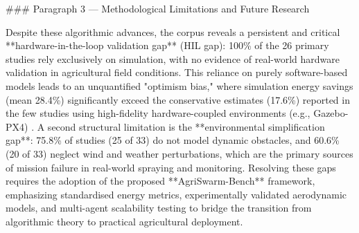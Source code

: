 ### Paragraph 3 — Methodological Limitations and Future Research

Despite these algorithmic advances, the corpus reveals a persistent and critical **hardware-in-the-loop validation gap** (HIL gap): 100\% of the 26 primary studies rely exclusively on simulation, with no evidence of real-world hardware validation in agricultural field conditions. This reliance on purely software-based models leads to an unquantified "optimism bias," where simulation energy savings (mean 28.4\%) significantly exceed the conservative estimates (17.6\%) reported in the few studies using high-fidelity hardware-coupled environments (e.g., Gazebo-PX4) \cite{li2023,rao2024}. A second structural limitation is the **environmental simplification gap**: 75.8\% of studies (25 of 33) do not model dynamic obstacles, and 60.6\% (20 of 33) neglect wind and weather perturbations, which are the primary sources of mission failure in real-world spraying and monitoring. Resolving these gaps requires the adoption of the proposed **AgriSwarm-Bench** framework, emphasizing standardised energy metrics, experimentally validated aerodynamic models, and multi-agent scalability testing to bridge the transition from algorithmic theory to practical agricultural deployment.
